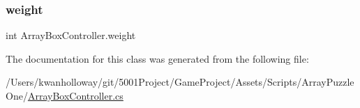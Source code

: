 \mbox{\label{class_array_box_controller_a0703f2b4690bc71070aa58210187a4f5}} 
\subsubsection{\texorpdfstring{weight}{weight}}
{\footnotesize\ttfamily int Array\+Box\+Controller.\+weight}



The documentation for this class was generated from the following file\+:\begin{DoxyCompactItemize}
\item 
/\+Users/kwanholloway/git/5001\+Project/\+Game\+Project/\+Assets/\+Scripts/\+Array\+Puzzle\+One/\hyperlink{_array_box_controller_8cs}{Array\+Box\+Controller.\+cs}\end{DoxyCompactItemize}
